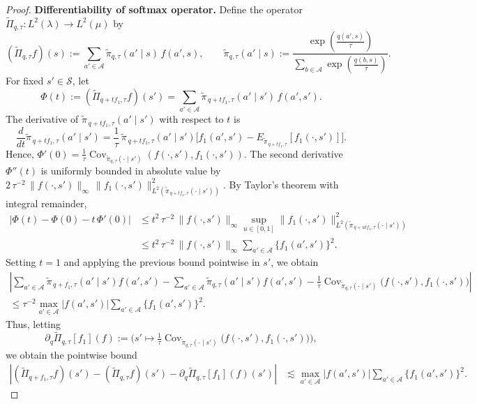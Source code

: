 \documentclass[11pt]{article}
\theoremstyle{plain}
\begin{document}
\begin{proof}
\noindent \textbf{Differentiability of softmax operator.} Define the operator $\widetilde{\Pi}_{q,\tau}: L^2(\lambda) \rightarrow L^2(\mu)$ by
\[
(\widetilde{\Pi}_{q,\tau} f)(s) := \sum_{a' \in \mathcal{A}} \widetilde{\pi}_{q,\tau}(a' \mid s)\, f(a', s),
\qquad
\widetilde{\pi}_{q,\tau}(a' \mid s) := \frac{\exp\!\left(\frac{q(a',s)}{\tau}\right)}{\sum_{b \in \mathcal{A}} \exp\!\left(\frac{q(b,s)}{\tau}\right)}.
\]
For fixed $s' \in \mathcal{S}$, let
\[
\Phi(t) := (\widetilde{\Pi}_{q + t f_1,\tau} f)(s') 
= \sum_{a' \in \mathcal{A}} \widetilde{\pi}_{\,q + t f_1,\tau}(a' \mid s')\, f(a', s').
\]
The derivative of $\widetilde{\pi}_{\,q + t f_1,\tau}(a' \mid s')$ with respect to $t$ is
\[
\frac{d}{dt} \widetilde{\pi}_{\,q + t f_1,\tau}(a' \mid s') 
= \frac{1}{\tau}\,\widetilde{\pi}_{\,q + t f_1,\tau}(a' \mid s') \big[ f_1(a', s') - E_{\widetilde{\pi}_{\,q + t f_1,\tau}}[f_1(\cdot, s')] \big].
\]
Hence, $\Phi'(0) = \tfrac{1}{\tau}\operatorname{Cov}_{\widetilde{\pi}_{q,\tau}(\cdot \mid s')}(f(\cdot, s'), f_1(\cdot, s'))$.  
The second derivative $\Phi''(t)$ is uniformly bounded in absolute value by $2\,\tau^{-2}\,\|f(\cdot, s')\|_\infty\,\|f_1(\cdot, s')\|_{L^2(\widetilde{\pi}_{\,q + t f_1,\tau}(\cdot \mid s'))}^2.$
By Taylor’s theorem with integral remainder,
\begin{align*}
\left| \Phi(t) - \Phi(0) - t\,\Phi'(0) \right|
&\le t^2\,\tau^{-2}\,\|f(\cdot, s')\|_\infty 
   \sup_{u \in [0,1]} \|f_1(\cdot, s')\|_{L^2(\widetilde{\pi}_{\,q + u t f_1,\tau}(\cdot \mid s'))}^2 \\
&\le t^2\,\tau^{-2}\,\|f(\cdot, s')\|_\infty \sum_{a' \in \mathcal{A}} \{f_1(a', s')\}^2 .
\end{align*}
Setting $t=1$ and applying the previous bound pointwise in $s'$, we obtain
\begin{align*}
    \left| 
\sum_{a' \in \mathcal{A}} \widetilde{\pi}_{\,q + f_1,\tau}(a' \mid s') f(a', s')
- \sum_{a' \in \mathcal{A}} \widetilde{\pi}_{q,\tau}(a' \mid s') f(a', s')
- \frac{1}{\tau}\operatorname{Cov}_{\widetilde{\pi}_{q,\tau}(\cdot \mid s')}\big(f(\cdot, s'), f_1(\cdot, s')\big)
\right|\\
\le \tau^{-2}\max_{a' \in \mathcal{A}} |f(a', s')| \sum_{a' \in \mathcal{A}} \big\{ f_1(a', s') \big\}^2.
\end{align*}
Thus, letting 
\[
\partial_q \widetilde{\Pi}_{q,\tau}[f_1](f) := \big(s' \mapsto \tfrac{1}{\tau}\operatorname{Cov}_{\widetilde{\pi}_{q,\tau}(\cdot \mid s')}\big(f(\cdot, s'), f_1(\cdot, s')\big)\big),
\]
we obtain the pointwise bound
\begin{align*}
    \left|(\widetilde{\Pi}_{q + f_1,\tau} f)(s') - (\widetilde{\Pi}_{q,\tau} f)(s') - \partial_q \widetilde{\Pi}_{q,\tau}[f_1](f)(s') \right| 
&\lesssim  \max_{a' \in \mathcal{A}} |f(a', s')| \sum_{a' \in \mathcal{A}} \big\{ f_1(a', s') \big\}^2.
\end{align*}


\end{proof}
\end{document}

